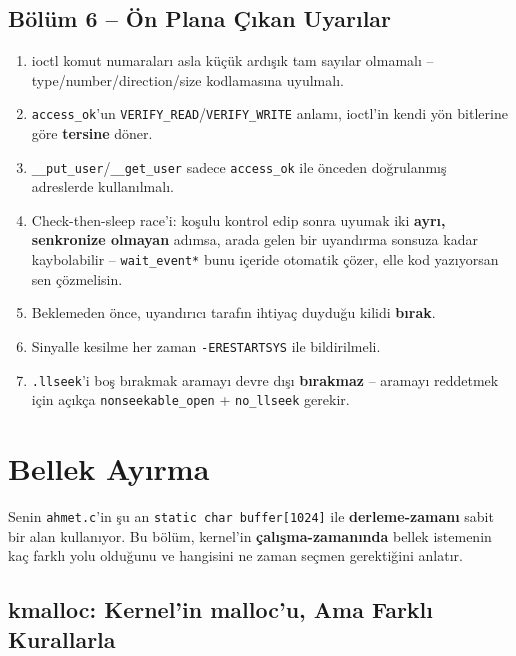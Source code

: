 \documentclass[11pt,a4paper]{article}
\begin{document}
\subsection*{B\"ol\"um 6 -- \"On Plana \c{C}\i kan Uyar\i lar}
\begin{enumerate}[leftmargin=1.2cm]
  \item ioctl komut numaraları asla küçük ardışık tam sayılar
  olmamalı -- type/number/direction/size kodlamasına uyulmalı.
  \item \texttt{access\_ok}'un \texttt{VERIFY\_READ}/\texttt{VERIFY\_WRITE}
  anlamı, ioctl'in kendi yön bitlerine göre \textbf{tersine} döner.
  \item \texttt{\_\_put\_user}/\texttt{\_\_get\_user} sadece
  \texttt{access\_ok} ile önceden doğrulanmış adreslerde kullanılmalı.
  \item Check-then-sleep race'i: koşulu kontrol edip sonra uyumak iki
  \textbf{ayrı, senkronize olmayan} adımsa, arada gelen bir uyandırma
  sonsuza kadar kaybolabilir -- \texttt{wait\_event*} bunu içeride
  otomatik çözer, elle kod yazıyorsan sen çözmelisin.
  \item Beklemeden önce, uyandırıcı tarafın ihtiyaç duyduğu kilidi
  \textbf{bırak}.
  \item Sinyalle kesilme her zaman \texttt{-ERESTARTSYS} ile
  bildirilmeli.
  \item \texttt{.llseek}'i boş bırakmak aramayı devre dışı
  \textbf{bırakmaz} -- aramayı reddetmek için açıkça
  \texttt{nonseekable\_open} + \texttt{no\_llseek} gerekir.
\end{enumerate}

\newpage

\section{Bellek Ay\i rma}
\label{sec:bolum8}

Senin \texttt{ahmet.c}'in şu an \texttt{static char buffer[1024]} ile
\textbf{derleme-zamanı} sabit bir alan kullanıyor. Bu bölüm, kernel'in
\textbf{çalışma-zamanında} bellek istemenin kaç farklı yolu olduğunu ve
hangisini ne zaman seçmen gerektiğini anlatır.

\subsection{kmalloc: Kernel'in malloc'u, Ama Farklı Kurallarla}
\end{document}
